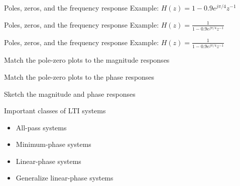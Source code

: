\documentclass[10pt]{beamer}
\begin{document}
\begin{frame}{Poles, zeros, and the frequency response}
	Example: $H(z) = 1 - 0.9e^{j\pi/4}z^{-1}$
	\begin{center}
		\resizebox{\linewidth}{!}{}
	\end{center}	
\end{frame}

\begin{frame}{Poles, zeros, and the frequency response}
	Example: $H(z) = \displaystyle\frac{1}{1 - 0.9e^{j\pi/4}z^{-1}}$
	\begin{center}
		\resizebox{\linewidth}{!}{}
	\end{center}	
\end{frame}

\begin{frame}{Poles, zeros, and the frequency response}
	Example: $H(z) = \displaystyle\frac{1}{1 - 0.9e^{j\pi/4}z^{-1}}$
	\begin{center}
		\resizebox{\linewidth}{!}{}
	\end{center}	
\end{frame}

%
\begin{frame}{Match the pole-zero plots to the magnitude responses}
	\hspace*{-1cm}\resizebox{\paperwidth}{!}{}
\end{frame}

%
\begin{frame}{Match the pole-zero plots to the phase responses}
	\hspace*{-1cm}\resizebox{\paperwidth}{!}{}
\end{frame}

%
\begin{frame}{Sketch the magnitude and phase responses}
	\hspace*{-1cm}\resizebox{0.95\paperwidth}{!}{}
\end{frame}

\begin{frame}{Important classes of LTI systems}

\begin{itemize}
	\item All-pass systems
	\item Minimum-phase systems
	\item Linear-phase systems
	\item Generalize linear-phase systems
\end{itemize}

\end{frame}
\end{document}
